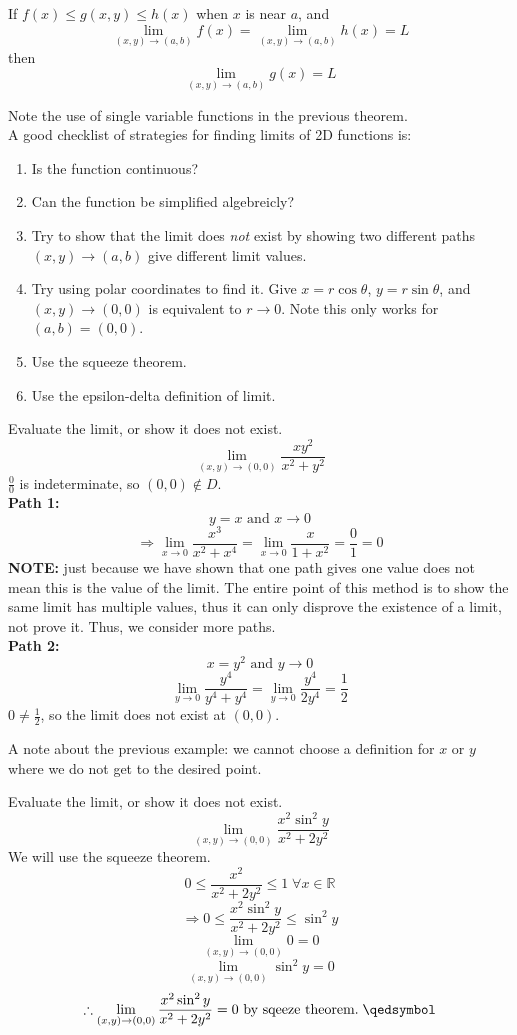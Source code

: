 \begin{theorem}
    If \(f(x)\leq g(x,y)\leq h(x)\) when \(x\) is near \(a\), and
    \[\lim_{(x,y)\to (a,b)}f(x)=\lim_{(x,y)\to (a,b)}h(x)=L\]
    then
    \[\lim_{(x,y)\to (a,b)}g(x)=L\]
\end{theorem}
Note the use of single variable functions in the previous theorem.\\
A good checklist of strategies for finding limits of 2D functions is:
\begin{enumerate}
    \item Is the function continuous?
    \item Can the function be simplified algebreicly?
    \item Try to show that the limit does \emph{not} exist by showing two different paths \((x,y)\to (a,b)\) give different limit values.
    \item Try using polar coordinates to find it. Give \(x=r\cos \theta \), \(y=r\sin \theta \), and \((x,y)\to (0,0)\) is equivalent to \(r\to 0\). Note this only works for \((a,b)=(0,0)\). 
    \item Use the squeeze theorem. 
    \item Use the epsilon-delta definition of limit. 
\end{enumerate}
\begin{eg}
    Evaluate the limit, or show it does not exist.
    \[
        \lim_{(x,y) \to (0,0)} \frac{xy^2}{x^2 +y^2}
    \] 
    \(\frac{0}{0}\) is indeterminate, so \((0,0)\notin D\).\\
    \textbf{Path 1:}
    \[
        y=x\text{ and } x\to 0
    \]
    \[
        \Longrightarrow \lim_{x\to 0}\frac{x^3}{x^2 +x^4}=\lim_{x\to 0}\frac{x}{1+x^2}=\frac{0}{1}=0
    \]
    \textbf{NOTE:} just because we have shown that one path gives one value does not mean this is the value of the limit. The entire point of this method is to show the same limit has multiple values, thus it can only disprove the existence of a limit, not prove it. Thus, we consider more paths.\\
    \textbf{Path 2:}
    \[
        x=y^2 \text{ and } y\to 0
    \]
    \[
        \lim_{y\to 0}\frac{y^4}{y^4 +y^4}=\lim_{y \to 0} \frac{y^4}{2y^4}=\frac{1}{2}
    \]
    \(0\neq \frac{1}{2}\), so the limit does not exist at \((0,0)\).
\end{eg}
A note about the previous example: we cannot choose a definition for \(x\) or \(y\) where we do not get to the desired point.
\begin{eg}
    Evaluate the limit, or show it does not exist. 
    \[
        \lim_{(x,y)\to (0,0)}\frac{x^2 \sin ^2 y}{x^2 +2y^2}
    \]
    We will use the squeeze theorem. 
    \[
        0\leq \frac{x^2}{x^2 +2y^2}\leq 1\;\forall x\in\mathbb{R}
    \]
    \[
        \Longrightarrow 0\leq \frac{x^2 \sin ^2 y}{x^2 +2y^2}\leq \sin ^2 y
    \]
    \[
        \lim_{(x,y)\to (0,0)}0=0
    \]
    \[
        \lim_{(x,y)\to (0,0)}\sin ^2 y=0
    \]
    \[
        \therefore \lim_{(x,y)\to (0,0)}\frac{x^2 \sin ^2 y}{x^2 +2y^2}=0\text{ by sqeeze theorem.}\;\qedsymbol 
    \]
\end{eg}
